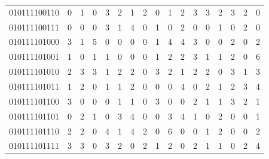 \documentclass[10pt,a4paper]{article}
\begin{document}
\begin{longtable}{ |c|c|c|c|c|c|c|c|c|c|c|c|c|c|c|c|c| }
    010111100110              & 0                            & 1                                & 0                            & 3                              & 2   & 1   & 2   & 0   & 1   & 2   & 3   & 3   & 2   & 3   & 2   & 0   \\
    010111100111              & 0                            & 0                                & 0                            & 3                              & 1   & 4   & 0   & 1   & 0   & 2   & 0   & 0   & 1   & 0   & 2   & 0   \\
    010111101000              & 3                            & 1                                & 5                            & 0                              & 0   & 0   & 0   & 1   & 4   & 4   & 3   & 0   & 0   & 2   & 0   & 2   \\
    010111101001              & 1                            & 0                                & 1                            & 1                              & 0   & 0   & 0   & 1   & 2   & 2   & 3   & 1   & 1   & 2   & 0   & 6   \\
    010111101010              & 2                            & 3                                & 3                            & 1                              & 2   & 2   & 0   & 3   & 2   & 1   & 2   & 2   & 0   & 3   & 1   & 3   \\
    010111101011              & 1                            & 2                                & 0                            & 1                              & 1   & 2   & 0   & 0   & 0   & 4   & 0   & 2   & 1   & 2   & 3   & 4   \\
    010111101100              & 3                            & 0                                & 0                            & 0                              & 1   & 1   & 0   & 3   & 0   & 0   & 2   & 1   & 1   & 3   & 2   & 1   \\
    010111101101              & 0                            & 2                                & 1                            & 0                              & 3   & 4   & 0   & 0   & 3   & 4   & 1   & 0   & 2   & 0   & 0   & 1   \\
    010111101110              & 2                            & 2                                & 0                            & 4                              & 1   & 4   & 2   & 0   & 6   & 0   & 0   & 1   & 2   & 0   & 0   & 2   \\
    010111101111              & 3                            & 3                                & 0                            & 3                              & 2   & 0   & 2   & 1   & 2   & 0   & 2   & 1   & 1   & 0   & 2   & 4   \\

\end{longtable}
\end{document}
